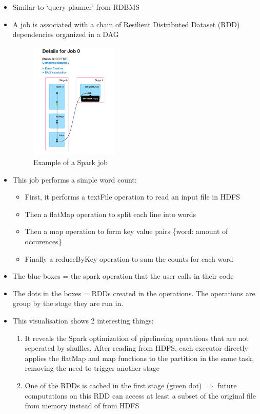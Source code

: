 \documentclass{article}
\begin{document}
\begin{itemize}
    \item Similar to `query planner' from RDBMS
    \item A job is associated with a chain of Resilient Distributed Dataset (RDD) dependencies organized in a DAG
\begin{figure}[H]
    \centering
    \includegraphics[width=0.4\textwidth]{spark.png}
    \caption{Example of a Spark job}
\end{figure}
    \item This job performs a simple word count: 
    \begin{itemize}
        \item First, it performs a textFile operation to read an input file in HDFS
        \item Then a flatMap operation to split each line into words
        \item Then a map operation to form key value pairs \{word: amount of occurences\}
        \item Finally a reduceByKey operation to sum the counts for each word
    \end{itemize}
    \item The blue boxes = the spark operation that the user calls in their code
    \item The dots in the boxes = RDDs created in the operations. The operations are group by the stage they are run in.
    \item This visualisation shows 2 interesting things:
    \begin{enumerate}
        \item It reveals the Spark optimization of pipelineing operations that are not seperated by shuffles. After reading from HDFS, each executor directly applies the flatMap and map functions to the partition in the same task, removing the need to trigger another stage
        \item One of the RDDs is cached in the first stage (green dot) $\Rightarrow$ future computations on this RDD can access at least a subset of the original file from memory instead of from HDFS
    \end{enumerate}
\end{itemize}
\end{document}
